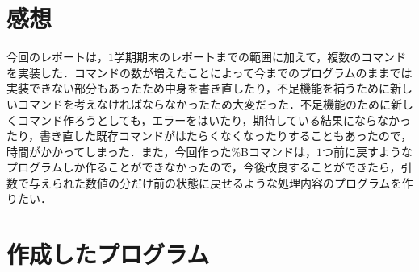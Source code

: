 \documentclass[a4j,11pt]{jarticle}
\begin{document}
\section{感想}
今回のレポートは，$1$学期期末のレポートまでの範囲に加えて，複数のコマンドを実装した．コマンドの数が増えたことによって今までのプログラムのままでは実装できない部分もあったため中身を書き直したり，不足機能を補うために新しいコマンドを考えなければならなかったため大変だった．不足機能のために新しくコマンド作ろうとしても，エラーをはいたり，期待している結果にならなかったり，書き直した既存コマンドがはたらくなくなったりすることもあったので，時間がかかってしまった．また，今回作った\%Bコマンドは，$1$つ前に戻すようなプログラムしか作ることができなかったので，今後改良することができたら，引数で与えられた数値の分だけ前の状態に戻せるような処理内容のプログラムを作りたい．

\section{作成したプログラム}\label{program}
\end{document}
